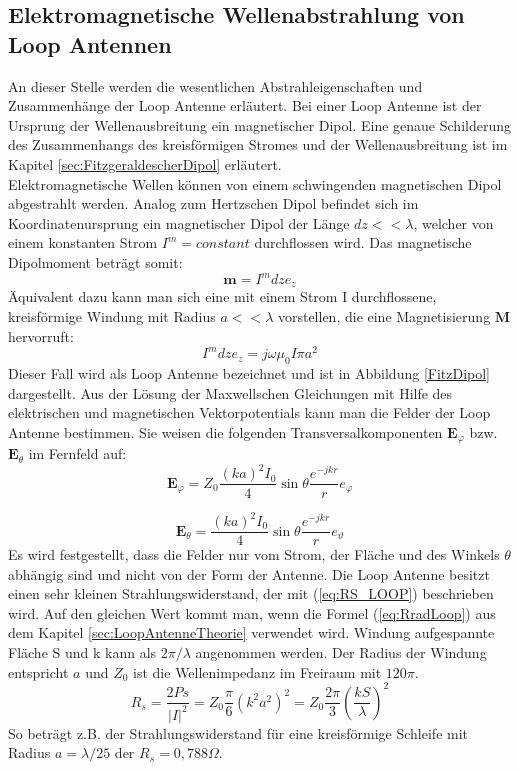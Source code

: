 \subsection{Elektromagnetische Wellenabstrahlung von Loop Antennen}
An dieser Stelle werden die wesentlichen Abstrahleigenschaften und Zusammenhänge der Loop Antenne erläutert.
Bei einer Loop Antenne ist der Ursprung der Wellenausbreitung ein magnetischer Dipol. Eine genaue Schilderung des Zusammenhangs des kreisförmigen Stromes und der Wellenausbreitung ist im Kapitel \ref{sec:FitzgeraldescherDipol} erläutert. \\
Elektromagnetische Wellen können  von einem schwingenden magnetischen Dipol
abgestrahlt werden. Analog zum Hertzschen Dipol befindet sich im Koordinatenursprung
ein magnetischer Dipol der Länge $dz<<\lambda$, welcher von einem konstanten
Strom $I^{m}=constant$ durchflossen wird. Das magnetische Dipolmoment beträgt somit:
\begin{equation}
\textbf{m}=I^{m}dze_z
\end{equation}
Äquivalent dazu kann man sich eine mit einem Strom I durchflossene, kreisförmige Windung mit Radius $a<<\lambda$ vorstellen, die eine Magnetisierung $\textbf{M}$ hervorruft:
\begin{equation}
I^{m}dze_{z}=j\omega\mu_{0}I\pi a^{2}
\end{equation}
Dieser Fall wird als Loop Antenne bezeichnet und ist in Abbildung \ref{FitzDipol} dargestellt. Aus der Lösung der Maxwellschen Gleichungen mit Hilfe des elektrischen und
magnetischen Vektorpotentials kann man die Felder der Loop Antenne bestimmen.
Sie weisen die folgenden Transversalkomponenten $\textbf{E}_{\varphi}$ bzw.$\textbf{E}_{\theta}$ im Fernfeld auf:
\begin{equation}
\textbf{E}_{\varphi}=Z_{0}\dfrac{(ka)^2I_{0}}{4}\sin \theta \dfrac{e^{-jkr}}{r} e_{\varphi}
\end{equation}

\begin{equation}
\textbf{E}_{\theta}=\dfrac{(ka)^2I_{0}}{4}\sin \theta \dfrac{e^{-jkr}}{r} e_{\vartheta}
\end{equation}
Es wird festgestellt, dass die Felder nur vom Strom, der Fläche und des Winkels $\theta$ abhängig sind
und nicht von der Form der Antenne. 
Die Loop Antenne besitzt einen sehr kleinen Strahlungswiderstand, der mit (\ref{eq:RS_LOOP}) beschrieben wird. Auf den gleichen Wert kommt man, wenn die Formel (\ref{eq:RradLoop}) aus dem Kapitel \ref{sec:LoopAntenneTheorie} verwendet wird. Windung aufgespannte Fläche S  und k kann als $2\pi/\lambda$ angenommen werden. Der Radius der Windung entspricht $a$ und $Z_0$ ist die Wellenimpedanz im Freiraum mit $120\pi$.
\begin{equation}\label{eq:RS_LOOP}
R_{s}=\dfrac{2Ps}{|I|^{2}}=Z_{0}\dfrac{\pi}{6}(k^{2}a^{2})^{2}=Z_{0}\dfrac{2\pi}{3}\left(\dfrac{kS}{\lambda}\right)^{2} 
\end{equation}
So beträgt z.B. der Strahlungswiderstand für eine kreisförmige Schleife mit Radius $a = \lambda/25$ der  $R_{s} = 0,788\Omega$.


